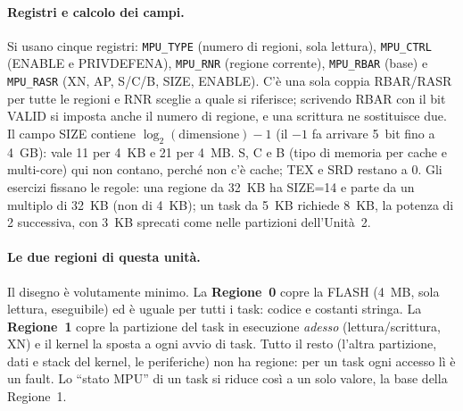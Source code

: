 \paragraph*{Registri e calcolo dei campi.}
Si usano cinque registri: \texttt{MPU\_TYPE} (numero di regioni, sola lettura),
\texttt{MPU\_CTRL} (ENABLE e PRIVDEFENA), \texttt{MPU\_RNR} (regione corrente),
\texttt{MPU\_RBAR} (base) e \texttt{MPU\_RASR} (XN, AP, S/C/B, SIZE, ENABLE). C'è una sola coppia
RBAR/RASR per tutte le regioni e RNR sceglie a quale si riferisce; scrivendo RBAR con il bit
VALID si imposta anche il numero di regione, e una scrittura ne sostituisce due. Il campo SIZE
contiene $\log_2(\mathrm{dimensione})-1$ (il $-1$ fa arrivare 5~bit fino a 4~GB): vale 11 per
4~KB e 21 per 4~MB. S, C e B (tipo di memoria per cache e multi-core) qui non contano, perché
non c'è cache; TEX e SRD restano a 0. Gli esercizi fissano le regole: una regione da 32~KB ha
SIZE=14 e parte da un multiplo di 32~KB (non di 4~KB); un task da 5~KB richiede 8~KB, la potenza
di 2 successiva, con 3~KB sprecati come nelle partizioni dell'Unità~2.

\paragraph*{Le due regioni di questa unità.}
Il disegno è volutamente minimo. La \textbf{Regione~0} copre la FLASH (4~MB, sola lettura,
eseguibile) ed è uguale per tutti i task: codice e costanti stringa. La \textbf{Regione~1} copre
la partizione del task in esecuzione \emph{adesso} (lettura/scrittura, XN) e il kernel la sposta
a ogni avvio di task. Tutto il resto (l'altra partizione, dati e stack del kernel, le
periferiche) non ha regione: per un task ogni accesso lì è un fault. Lo ``stato MPU'' di un task
si riduce così a un solo valore, la base della Regione~1.

